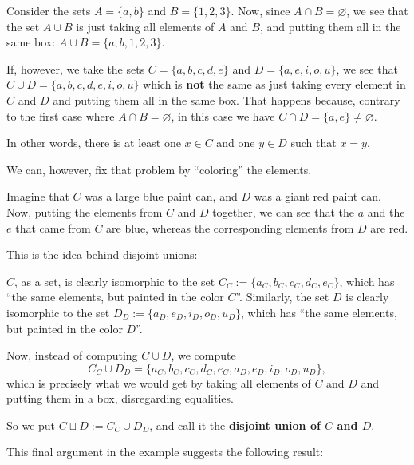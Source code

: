 \begin{ex}
	Consider the sets $A=\{a,b\}$ and $B=\{1,2,3\}$. Now, since $A\cap B=\varnothing$, we see that the set $A\cup B$ is just taking all elements of $A$ and $B$, and putting them all in the same box: $A\cup B=\{a,b,1,2,3\}$.
	
	If, however, we take the sets $C=\{a,b,c,d,e\}$ and $D=\{a,e,i,o,u\}$, we see that $C\cup D=\{a,b,c,d,e,i,o,u\}$ which is \textbf{not} the same as just taking every element in $C$ and $D$ and putting them all in the same box. That happens because, contrary to the first case where $A\cap B=\varnothing$, in this case we have $C\cap D=\{a,e\}\neq\varnothing$.
	
	In other words, there is at least one $x\in C$ and one $y\in D$ such that $x=y$.
	
	We can, however, fix that problem by ``coloring'' the elements.
	
	\bigskip
	Imagine that $C$ was a large blue paint can, and $D$ was a giant red paint can. Now, putting the elements from $C$ and $D$ together, we can see that the $a$ and the $e$ that came from $C$ are blue, whereas the corresponding elements from $D$ are red.
	
	This is the idea behind disjoint unions:
	
	$C$, as a set, is clearly isomorphic to the set $C_C:=\{a_C,b_C,c_C,d_C,e_C\}$, which has ``the same elements, but painted in the color $C$''. Similarly, the set $D$ is clearly isomorphic to the set $D_D:=\{a_D,e_D,i_D,o_D,u_D\}$, which has ``the same elements, but painted in the color $D$''.
	
	Now, instead of computing $C\cup D$, we compute $$C_C\cup D_D=\{a_C,b_C,c_C,d_C,e_C,a_D,e_D,i_D,o_D,u_D\},$$ which is precisely what we would get by taking all elements of $C$ and $D$ and putting them in a box, disregarding equalities.
	
	So we put $C\sqcup D:=C_C\cup D_D$, and call it the \textbf{disjoint union of $C$ and $D$}.
\end{ex}

This final argument in the example suggests the following result:

